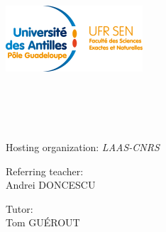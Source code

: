 \begin{titlepage}
	\begin{center}
		\includegraphics[scale=1.80]{../images/logo_ufr_sen.png} \\[2cm]
		\hspace{2cm}

		\HRule \\[0.4cm]
		\@title \\[0.4cm]
		\HRule \\[1cm]

		\@author \\ [1.5cm]

		{\large Hosting organization: \textsl{LAAS-CNRS}} \\[1.5cm]

		\begin{minipage}{0.7\textwidth}
			\begin{flushleft}
				Referring teacher:\\
				\hspace{0.2cm}  Andrei \textsc{DONCESCU}
			\end{flushleft}
		\end{minipage}

		\vspace{-0.85cm}
		\hspace{9cm}
		\begin{minipage}{0.3\textwidth}
			\begin{flushleft}
				Tutor:\\
				\hspace{0.2cm} Tom \textsc{GUÉROUT}
			\end{flushleft}
		\end{minipage}\\[3cm]

		\@date
	\end{center}
\end{titlepage}
